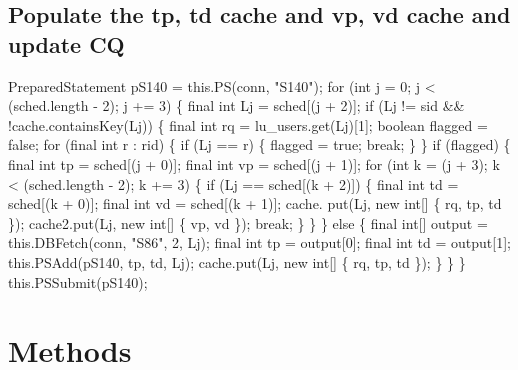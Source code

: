 \subsection{Populate the tp, td cache and vp, vd cache and update CQ}
\nwenddocs{}\endmoddef{}
PreparedStatement pS140 = this.PS(conn, "S140");
for (int j = 0; j < (sched.length - 2); j += 3) \{
  final int Lj = sched[(j + 2)];
  if (Lj != sid && !cache.containsKey(Lj)) \{
    final int rq = lu_users.get(Lj)[1];
    boolean flagged = false;
    for (final int r : rid) \{
      if (Lj == r) \{
        flagged = true;
        break;
      \}
    \}
    if (flagged) \{
      final int tp = sched[(j + 0)];
      final int vp = sched[(j + 1)];
      for (int k = (j + 3); k < (sched.length - 2); k += 3) \{
        if (Lj == sched[(k + 2)]) \{
          final int td = sched[(k + 0)];
          final int vd = sched[(k + 1)];
          cache. put(Lj, new int[] \{ rq, tp, td \});
          cache2.put(Lj, new int[] \{ vp, vd \});
          break;
        \}
      \}
    \} else \{
      final int[] output = this.DBFetch(conn, "S86", 2, Lj);
      final int tp = output[0];
      final int td = output[1];
      this.PSAdd(pS140, tp, td, Lj);
      cache.put(Lj, new int[] \{ rq, tp, td \});
    \}
  \}
\}
this.PSSubmit(pS140);
\nwendcode{}\nwdocspar

\section{Methods}

